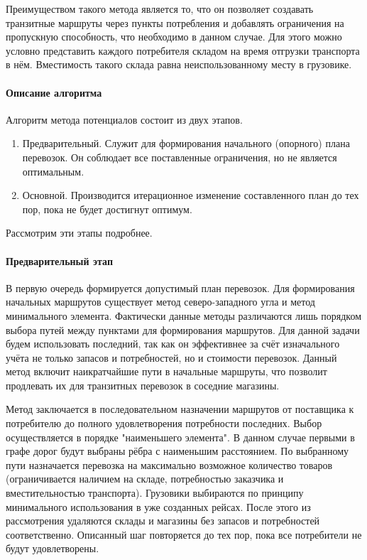 	Преимуществом такого метода является то, что он позволяет создавать транзитные маршруты через пункты потребления и добавлять ограничения на пропускную способность, что необходимо в данном случае. Для этого можно условно представить каждого потребителя складом на время отгрузки транспорта в нём. Вместимость такого склада равна неиспользованному месту в грузовике.
	
	\paragraph{Описание алгоритма}
	
	Алгоритм метода потенциалов состоит из двух этапов.
	\begin{enumerate}
		\item Предварительный. Служит для формирования начального (опорного) плана перевозок. Он соблюдает все поставленные ограничения, но не является оптимальным.
		\item Основной. Производится итерационное изменение составленного план до тех пор, пока не будет достигнут оптимум.
	\end{enumerate} 

	Рассмотрим эти этапы подробнее.
	
	\paragraph{Предварительный этап}
	
	В первую очередь формируется допустимый план перевозок. Для формирования начальных маршрутов существует метод северо-западного угла и метод минимального элемента\cite{trans:comporation}. Фактически данные методы различаются лишь порядком выбора путей между пунктами для формирования маршрутов. Для данной задачи будем использовать последний, так как он эффективнее \cite{potential:polyindex} за счёт изначального учёта не только запасов и потребностей, но и стоимости перевозок. Данный метод включит наикратчайшие пути в начальные маршруты, что позволит продлевать их для транзитных перевозок в соседние магазины.
	
	Метод заключается в последовательном назначении маршрутов от поставщика к потребителю до полного удовлетворения потребности последних. Выбор осуществляется в порядке "наименьшего элемента". В данном случае первыми в графе дорог будут выбраны рёбра с наименьшим расстоянием. По выбранному пути назначается перевозка на максимально возможное количество товаров (ограничивается наличием на складе, потребностью заказчика и вместительностью транспорта). Грузовики выбираются по принципу минимального использования в уже созданных рейсах. После этого из рассмотрения удаляются склады и магазины без запасов и потребностей соответственно. Описанный шаг повторяется до тех пор, пока все потребители не будут удовлетворены.
	
